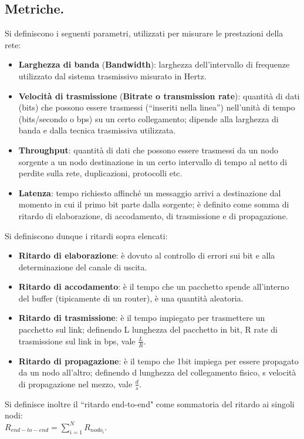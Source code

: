 \documentclass[11pt, italian, openany]{book}
\begin{document}
\begin{sloppypar}
\subsection*{Metriche.}
Si definiscono i seguenti parametri, utilizzati per misurare le prestazioni della rete:
\begin{itemize}[topsep=0pt]
	\itemsep-0.3em
	\item \textbf{Larghezza di banda} (\textbf{Bandwidth}): larghezza dell’intervallo di frequenze utilizzato dal sistema trasmissivo misurato in Hertz.
	\item \textbf{Velocit\`a di trasmissione} (\textbf{Bitrate o transmission rate}): quantit\`a di dati (bits) che possono essere trasmessi (“inseriti
	nella linea”) nell'unit\`a di tempo (bits/secondo o bps) su un certo collegamento; dipende alla larghezza di banda e dalla tecnica trasmissiva
	utilizzata.
	\item \textbf{Throughput}: quantit\`a di dati che possono essere trasmessi da un nodo sorgente a un nodo destinazione in un certo intervallo di tempo
	al netto di perdite sulla rete, duplicazioni, protocolli etc.
	\item \textbf{Latenza}: tempo richiesto affinch\'e un messaggio arrivi a destinazione dal momento in cui il primo bit parte dalla sorgente; \`e
	definito come somma di ritardo di elaborazione, di accodamento, di trasmissione e di propagazione.
\end{itemize}
Si definiscono dunque i ritardi sopra elencati:
\begin{itemize}[topsep=0pt]
	\itemsep-0.3em
	\item \textbf{Ritardo di elaborazione}: \`e dovuto al controllo di errori sui bit e alla determinazione del canale di uscita.
	\item \textbf{Ritardo di accodamento}: \`e il tempo che un pacchetto spende all'interno del buffer (tipicamente di un router), \`e una
	quantit\`a aleatoria.
	\item \textbf{Ritardo di trasmissione}: \`e il tempo impiegato per trasmettere un pacchetto sul link; definendo L lunghezza del pacchetto in bit,
	R rate di trasmissione sul link in bps, vale \( \frac{L}{R} \).
	\item \textbf{Ritardo di propagazione}: \`e il tempo che 1bit impiega per essere propagato da un nodo all'altro; definendo d lunghezza del
	collegamento fisico, s velocit\`a di propagazione nel mezzo, vale \( \frac{d}{s} \).
\end{itemize}
Si definisce inoltre il ``ritardo end-to-end" come sommatoria del ritardo ai singoli nodi: \\\( R_{end-to-end} = \sum_{i=1}^{N} R_{nodo_i}\).


\end{sloppypar}
\end{document}
